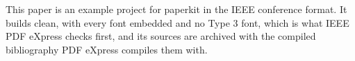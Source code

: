 This paper is an example project for paperkit in the IEEE conference format.
It builds clean, with every font embedded and no Type 3 font, which is what
IEEE PDF eXpress checks first, and its sources are archived with the compiled
bibliography PDF eXpress compiles them with.
